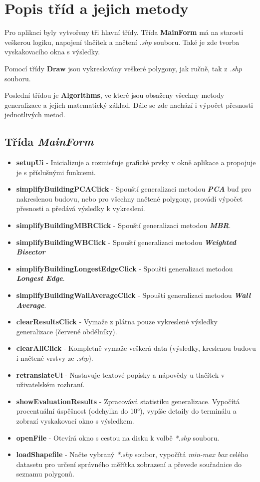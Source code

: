 \documentclass[12pt, a4paper]{article}
\begin{document}
\section{Popis tříd a jejich metody}
Pro aplikaci byly vytvořeny tři hlavní třídy. Třída \textbf{MainForm} má na starosti veškerou logiku, napojení tlačítek a načtení \textit{.shp} souboru. Také je zde tvorba vyskakovacího okna s výsledky. 

Pomocí třídy \textbf{Draw} jsou vykreslovány veškeré polygony, jak ručně, tak z \textit{.shp} souboru. 

Poslední třídou je \textbf{Algorithms}, ve které jsou obsaženy všechny metody generalizace a jejich matematický základ. Dále se zde nachází i výpočet přesnosti jednotlivých metod.

\subsection{Třída \textit{MainForm}}
\begin{itemize}
  \item \textbf{setupUi} - Inicializuje a rozmisťuje grafické prvky v okně aplikace a propojuje je s příslušnými funkcemi.
  \item \textbf{simplifyBuildingPCAClick} - Spouští generalizaci metodou \textbf{\textit{PCA}} buď pro nakreslenou budovu, nebo pro všechny načtené polygony, provádí výpočet přesnosti a předává výsledky k vykreslení.
  \item \textbf{simplifyBuildingMBRClick} - Spouští generalizaci metodou \textbf{\textit{MBR}}.
  \item \textbf{simplifyBuildingWBClick} - Spouští generalizaci metodou \textbf{\textit{Weighted Bisector}}
  \item \textbf{simplifyBuildingLongestEdgeClick} - Spouští generalizaci metodou \textbf{\textit{Longest Edge}}.
  \item \textbf{simplifyBuildingWallAverageClick} - Spouští generalizaci metodou \textbf{\textit{Wall Average}}.
  \item \textbf{clearResultsClick} - Vymaže z plátna pouze vykreslené výsledky generalizace (červené obdélníky).
  \item \textbf{clearAllClick} - Kompletně vymaže veškerá data (výsledky, kreslenou budovu i načtené vrstvy ze \textit{.shp}).
  \item \textbf{retranslateUi} - Nastavuje textové popisky a nápovědy u tlačítek v uživatelském rozhraní.
  \item \textbf{showEvaluationResults} - Zpracovává statistiku generalizace. Vypočítá procentuální úspěšnost (odchylka do 10°), vypíše detaily do terminálu a zobrazí vyskakovací okno s výsledkem.
  \item \textbf{openFile} - Otevírá okno s cestou na disku k volbě \textit{*.shp} souboru.
  \item \textbf{loadShapefile} - Načte vybraný \textit{*.shp} soubor, vypočítá \textit{min-max box} celého datasetu pro určení správného měřítka zobrazení a převede souřadnice do seznamu polygonů.
\end{itemize}
\end{document}
